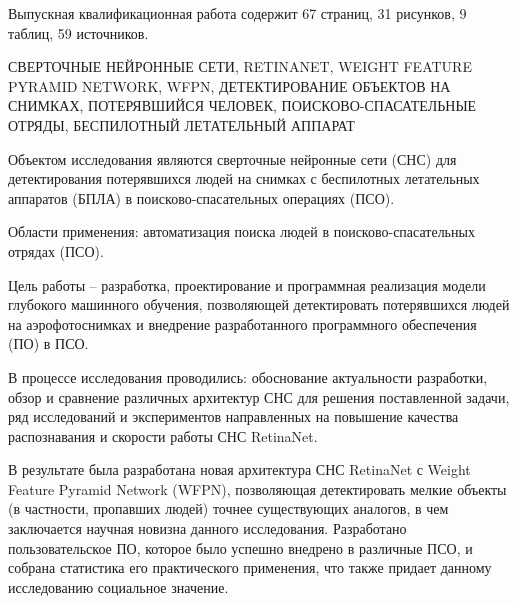 \documentclass[a4paper,14pt]{extarticle} %
\begin{document}
Выпускная квалификационная работа содержит 67 страниц, 31 рисунков, 9 таблиц, 59 источников.

\MakeUppercase{сверточные нейронные сети, RetinaNet, Weight Feature Pyramid Network, WFPN, детектирование объектов на снимках, потерявшийся человек, поисково-спасательные отряды, беспилотный летательный аппарат}

Объектом исследования являются сверточные нейронные сети (СНС) для детектирования потерявшихся людей на снимках с беспилотных летательных аппаратов (БПЛА) в поисково-спасательных операциях (ПСО).

Области применения: автоматизация поиска людей в поисково-спасательных отрядах (ПСО).

Цель работы -- разработка, проектирование и программная реализация модели глубокого машинного обучения, позволяющей детектировать потерявшихся людей на аэрофотоснимках и внедрение разработанного программного обеспечения (ПО) в ПСО.

В процессе исследования проводились: обоснование актуальности разработки, обзор и сравнение различных архитектур СНС для решения поставленной задачи, ряд исследований и экспериментов направленных на повышение качества распознавания и скорости работы СНС RetinaNet.

В результате была разработана новая архитектура СНС RetinaNet с Weight Feature Pyramid Network (WFPN), позволяющая детектировать мелкие объекты (в частности, пропавших людей) точнее существующих аналогов, в чем заключается научная новизна данного исследования. Разработано пользовательское ПО, которое было успешно внедрено в различные ПСО, и собрана статистика его практического применения, что также придает данному исследованию социальное значение.
\end{document}
